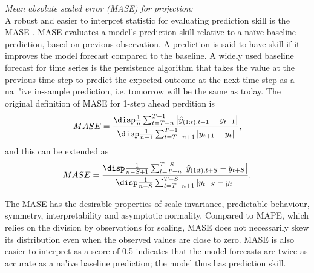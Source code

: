 \vspace{0.2cm} \noindent
{\it Mean absolute scaled error (MASE) for projection:}\\ 
A robust and easier to interpret statistic for evaluating prediction skill is the MASE \citep{hyndman2006another}. MASE evaluates a model's prediction skill relative to a na\" {i}ve baseline prediction, based on previous observation. A prediction is said to have skill if it improves the model forecast compared to the baseline. A widely used baseline forecast for time series is the persistence algorithm that takes the value at the previous time step to predict the expected outcome at the next time step as a na\ "{i}ve in-sample prediction, i.e. tomorrow will be the same as today. The original definition of MASE for 1-step ahead perdition is 
\begin{equation}
{MASE=\frac{\disp \frac{1}{n} \sum_{t=T-n}^{T-1} \left| \hat{y}_{(1:t),t+1}-y_{t+1} \right|}
{\disp \frac{1}{n-1} \sum_{t=T-n+1}^{T-1} \left|y_{t+1}-y_{t}\right|}}, 
\end{equation}
and this can be extended as 
\begin{equation}
MASE=
\frac{\disp \frac{1}{n-S+1} \sum_{t=T-n}^{T-S}  \left| \hat{y}_{(1:t),t+S}-y_{t+S} \right|}
{\disp \frac{1}{n-S} \sum_{t=T-n+1}^{T-S} \left|y_{t+S}-y_{t}\right|}. 
\end{equation} 

The MASE has the desirable properties of scale invariance, predictable behaviour, symmetry, interpretability and asymptotic normality. Compared to MAPE, which relies on the division by observations for scaling, MASE does not necessarily skew its distribution even when the observed values are close to zero. MASE is also easier to interpret as a score of 0.5 indicates that the model forecasts are twice as accurate as a na\''{i}ve baseline prediction; the model thus has prediction skill.
\vspace{0.2cm}


